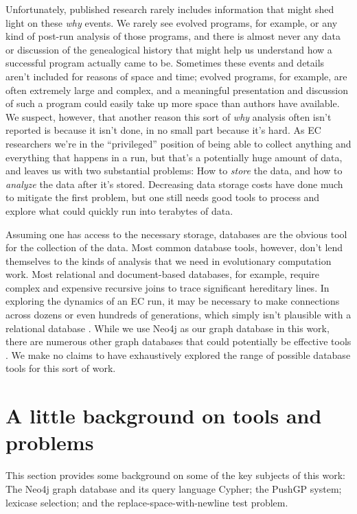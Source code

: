 Unfortunately, published research rarely includes information that might shed light on 
these \emph{why} events. We rarely see evolved programs, for example, or any kind of post-run analysis
of those programs, and there is almost never any data or discussion of the genealogical history that
might help us understand how a successful program actually came to be. 
Sometimes these events and details aren't included
for reasons of space and time; evolved programs, for example, are often extremely large and complex,
and a meaningful presentation and discussion of such a program could easily take up more space than
authors have available.
We suspect, however, that another reason this sort of \emph{why} analysis often isn't 
reported is because it isn't done, in no small part because it's hard. As EC researchers we're in the
``privileged'' position of being able to collect anything and everything that happens in a run, 
but that's a potentially huge amount of data, and leaves us with two substantial problems: 
How to \emph{store} the data, and how to \emph{analyze} the data
after it's stored. 
Decreasing data storage costs have done much to mitigate the first problem, but one still needs good
tools to process and explore what could quickly run into terabytes of data.

Assuming one has access to the necessary storage, 
databases are the obvious tool for the collection of the data. Most common database tools,
however,
don't lend themselves to the kinds of analysis that we need in evolutionary computation work. 
Most relational and document-based databases, for example, require complex and expensive 
recursive joins to trace significant hereditary lines.
In exploring the dynamics of an EC run, it may be necessary to
make connections across dozens or even hundreds of generations, which simply isn't plausible with a
relational database \citep{Robinson:GraphDB:Book}. 
While we use Neo4j as our graph database in this work, there are 
numerous other 
graph databases that could potentially be effective tools \citep{wiki:GraphDB}. We make no claims
to have exhaustively explored the range of possible database tools for this sort of work.

\section{A little background on tools and problems}
\label{sec:background}

This section provides some background on some of the key subjects of this work: The Neo4j graph 
database and its query language Cypher; the PushGP system; lexicase selection; and the 
replace-space-with-newline test problem.

